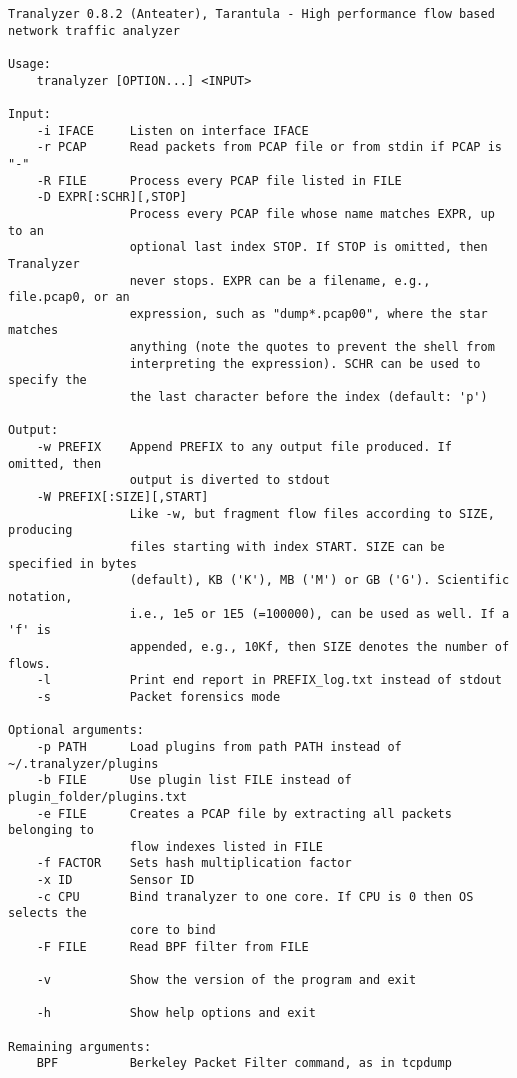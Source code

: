 \begin{verbatim}
Tranalyzer 0.8.2 (Anteater), Tarantula - High performance flow based network traffic analyzer

Usage:
    tranalyzer [OPTION...] <INPUT>

Input:
    -i IFACE     Listen on interface IFACE
    -r PCAP      Read packets from PCAP file or from stdin if PCAP is "-"
    -R FILE      Process every PCAP file listed in FILE
    -D EXPR[:SCHR][,STOP]
                 Process every PCAP file whose name matches EXPR, up to an
                 optional last index STOP. If STOP is omitted, then Tranalyzer
                 never stops. EXPR can be a filename, e.g., file.pcap0, or an
                 expression, such as "dump*.pcap00", where the star matches
                 anything (note the quotes to prevent the shell from
                 interpreting the expression). SCHR can be used to specify the
                 the last character before the index (default: 'p')

Output:
    -w PREFIX    Append PREFIX to any output file produced. If omitted, then
                 output is diverted to stdout
    -W PREFIX[:SIZE][,START]
                 Like -w, but fragment flow files according to SIZE, producing
                 files starting with index START. SIZE can be specified in bytes
                 (default), KB ('K'), MB ('M') or GB ('G'). Scientific notation,
                 i.e., 1e5 or 1E5 (=100000), can be used as well. If a 'f' is
                 appended, e.g., 10Kf, then SIZE denotes the number of flows.
    -l           Print end report in PREFIX_log.txt instead of stdout
    -s           Packet forensics mode

Optional arguments:
    -p PATH      Load plugins from path PATH instead of ~/.tranalyzer/plugins
    -b FILE      Use plugin list FILE instead of plugin_folder/plugins.txt
    -e FILE      Creates a PCAP file by extracting all packets belonging to
                 flow indexes listed in FILE
    -f FACTOR    Sets hash multiplication factor
    -x ID        Sensor ID
    -c CPU       Bind tranalyzer to one core. If CPU is 0 then OS selects the
                 core to bind
    -F FILE      Read BPF filter from FILE

    -v           Show the version of the program and exit

    -h           Show help options and exit

Remaining arguments:
    BPF          Berkeley Packet Filter command, as in tcpdump
\end{verbatim}

